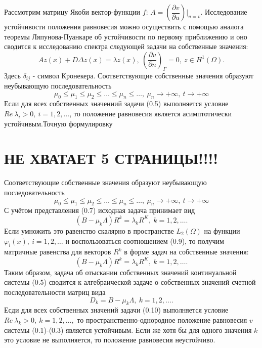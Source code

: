 \documentclass[9pt, a4paper]{extarticle}
\numberwithin{equation}{section}
\numberwithin{lemma}{section}
\numberwithin{definition}{section}
\numberwithin{notabene}{section}
\numberwithin{corollary}{section}
\begin{document}
	Рассмотрим матрицу Якоби вектор-функции $f$: $A = \left(\dfrac{\partial v}{\partial u}\right)\vert_{u=v}$.\newline
	Исследование устойчивости положения равновесия можно осуществить с помощью аналога теоремы Ляпунова-Пуанкаре об устойчивости по первому приближению и оно сводится к исследованию спектра следующей задачи на собственные значения:
	\begin{equation}
		Az(x) + D \Delta z(x) = \lambda z(x), \ \left(\dfrac{\partial v}{\partial n}\right)_\Gamma = 0, \ z \in H^1(\Omega).
	\end{equation}
	Здесь $\delta_{ij}$ - символ Кронекера.\newline
	Соответствующие собственные значения образуют неубывающую последовательность
	\begin{equation*}
		\mu_0 \leq \mu_1 \leq \mu_2 \leq \dots \leq \mu_n \leq \dots, \ \mu_n \to + \infty, \ t \to +\infty
	\end{equation*}
	Если для всех собственных значениий задачи (0.5) выполняется условие $Re\ \lambda_i > 0, \ i = 1, 2, \dots$, то положение равновесия является асимптотически устойчивым.Точную формулировку\newline
	\section*{НЕ ХВАТАЕТ 5 СТРАНИЦЫ!!!!}
	
	
	Соответствующие собственные значения образуют неубывающую последовательность
	\begin{equation*}
		\mu_0 \leq \mu_1 \leq \mu_2 \leq \dots \leq \mu_n \leq \dots, \ \mu_n \to + \infty, \ t \to +\infty
	\end{equation*}
	С учётом представления (0.7) исходная задача принимает вид 
	\begin{equation*}
		\left(B - \mu_k \Lambda\right) R^k = \lambda_k R^K, \ k = 1,2, \dots.
	\end{equation*}
	Если умножить это равенство скалярно в пространстве $L_2(\Omega)$ на функции $\varphi_i(x),\ i=1,2,\dots$ и воспользоваться соотношением (0.9), то получим матричные равенства для векторов $R^k$ в форме задач на собственные значения:
	\begin{equation}
		\left(B - \mu_k \Lambda\right) R^k = \lambda_k R^K, \ k = 1,2, \dots.
	\end{equation}
	Таким образом, задача об отыскании собственных значений континуальной системы (0.5) сводится к алгебраической задаче о собственных значений счетной последовательности  матриц вида
	\begin{equation}
		D_k = B - \mu_k \Lambda, \ k =1, 2, \dots .
	\end{equation}
	Есди для всех собственных значений задачи (0.10) выполняется условие $Re\ \lambda_k > 0, \ k =1,2,\dots, $ то пространственно-однородное положение равновесия $v$ системы (0.1)-(0.3) является устойчивым.\newline
	Если же хотя бы для одного значения $k$ это условие не выполняется, то положение равновесия неустойчиво. \newline
	
\end{document}
